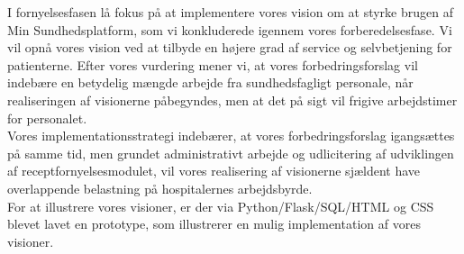 I fornyelsesfasen lå fokus på at implementere vores vision om at styrke brugen af Min Sundhedsplatform, som vi konkluderede igennem vores forberedelsesfase. Vi vil opnå vores vision ved at tilbyde en højere grad af service og selvbetjening for patienterne.
Efter vores vurdering mener vi, at vores forbedringsforslag vil indebære en betydelig mængde arbejde fra sundhedsfagligt personale, når realiseringen af visionerne påbegyndes, men at det på sigt vil frigive arbejdstimer for personalet.\\
Vores implementationsstrategi indebærer, at vores forbedringsforslag igangsættes på samme tid, men grundet administrativt arbejde og udlicitering af udviklingen af receptfornyelsesmodulet, vil vores realisering af visionerne sjældent have overlappende belastning på hospitalernes arbejdsbyrde.\\
For at illustrere vores visioner, er der via Python/Flask/SQL/HTML og CSS blevet lavet en prototype, som illustrerer en mulig implementation af vores visioner.\\
